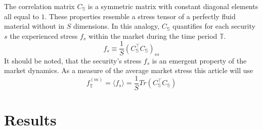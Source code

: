 \documentclass[11pt,twoside,a4paper]{article}
\begin{document}
The correlation matrix $C_\mathbb{S}$ is a symmetric matrix with constant diagonal elements all equal to $1$. These properties resemble a stress tensor of a perfectly fluid material without in $S$ dimensions. In this analogy, $C_\mathbb{S}$ quantifies for each security $s$ the experienced stress $f_s$ within the market during the time period $\mathbb{T}$.
\begin{equation}
f_s\equiv \frac{1}{S}(C_\mathbb{S}^\top C_\mathbb{S})_{ss}
\end{equation}
It should be noted, that the security's stress $f_s$ is an emergent property of the market dynamics. As a measure of the average market stress this article will use
\begin{equation}
f^{(m)}_\mathbb{T} = \langle f_s\rangle=\frac{1}{S}Tr\left(C_\mathbb{S}^\top C_\mathbb{S}\right)
\end{equation}
\section{Results}
\end{document}

